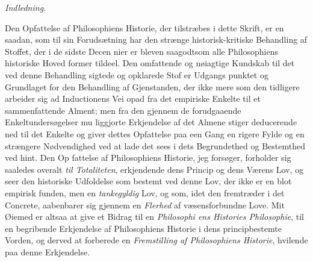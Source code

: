 \begin{center}
{\Large\emph{Indledning.}}
\end{center}

Den Opfattelse af Philosophiens Historie, der tilstræbes i dette
Skrift, er en saadan, som til sin Forudsætning har den strænge
historisk-kritiske Behandling af Stoffet, der i de sidste Decen\-%
nier er bleven saagodtsom alle Philosophiens historiske Hoved\-%
former tildeel. Den omfattende og nøiagtige Kundskab til det
ved denne Behandling sigtede og opklarede Stof er Udgangs\-%
punktet og Grundlaget for den Behandling af Gjenstanden, der
ikke mere som den tidligere arbeider sig ad Inductionens Vei
opad fra det empiriske Enkelte til et sammenfattende Alment;
men fra den gjennem de forudgaaende Enkeltundersøgelser mu\-%
liggjorte Erkjendelse af det Almene stiger deducerende ned
til det Enkelte og giver dettes Opfattelse paa een Gang en
rigere Fylde og en strængere Nødvendighed ved at lade det
sees i dets Begrundethed og Bestemthed ved hint. Den Op\-%
fattelse af Philosophiens Historie, jeg forsøger, forholder sig
saaledes overalt \emph{til Totaliteten}, erkjendende dens Princip
og dens Værens Lov, og seer den historiske Udfoldelse som
bestemt ved denne Lov, der ikke er en blot empirisk funden,
men en \emph{tankegyldig} Lov, og som, idet den fremtræder i det
Concrete, aabenbarer sig gjennem en \emph{Flerhed} af væsensforbundne
Love. Mit Øiemed er altsaa at give et Bidrag til en \emph{Philosophi\-%
ens Histories Philosophie}, til en begribende Erkjendelse
af Philosophiens Historie i dens principbestemte Vorden, og
derved at forberede en \emph{Fremstilling af Philosophiens
Historie}, hvilende paa denne Erkjendelse.


